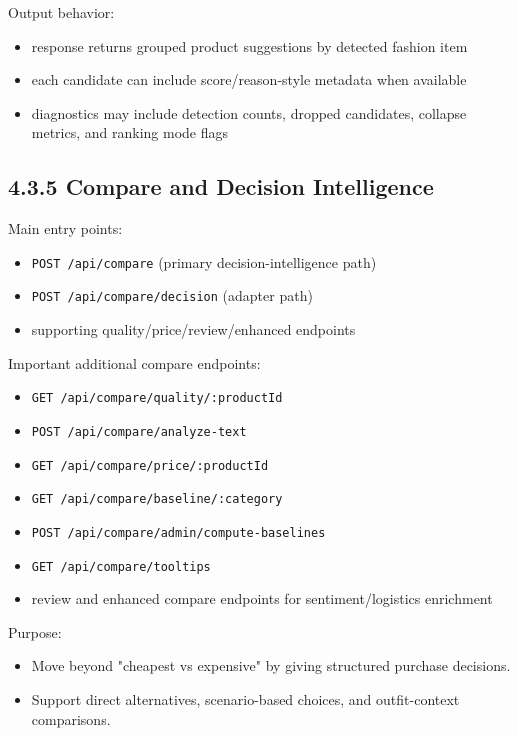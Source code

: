 \documentclass[12pt,a4paper]{report}
\begin{document}
Output behavior:

\begin{itemize}
\item response returns grouped product suggestions by detected fashion item
\item each candidate can include score/reason-style metadata when available
\item diagnostics may include detection counts, dropped candidates, collapse metrics, and ranking mode flags
\end{itemize}

\subsection{4.3.5 Compare and Decision Intelligence}
Main entry points:

\begin{itemize}
\item \texttt{POST /api/compare} (primary decision-intelligence path)
\item \texttt{POST /api/compare/decision} (adapter path)
\item supporting quality/price/review/enhanced endpoints
\end{itemize}

Important additional compare endpoints:

\begin{itemize}
\item \texttt{GET /api/compare/quality/:productId}
\item \texttt{POST /api/compare/analyze-text}
\item \texttt{GET /api/compare/price/:productId}
\item \texttt{GET /api/compare/baseline/:category}
\item \texttt{POST /api/compare/admin/compute-baselines}
\item \texttt{GET /api/compare/tooltips}
\item review and enhanced compare endpoints for sentiment/logistics enrichment
\end{itemize}

Purpose:

\begin{itemize}
\item Move beyond "cheapest vs expensive" by giving structured purchase decisions.
\item Support direct alternatives, scenario-based choices, and outfit-context comparisons.
\end{itemize}
\end{document}
